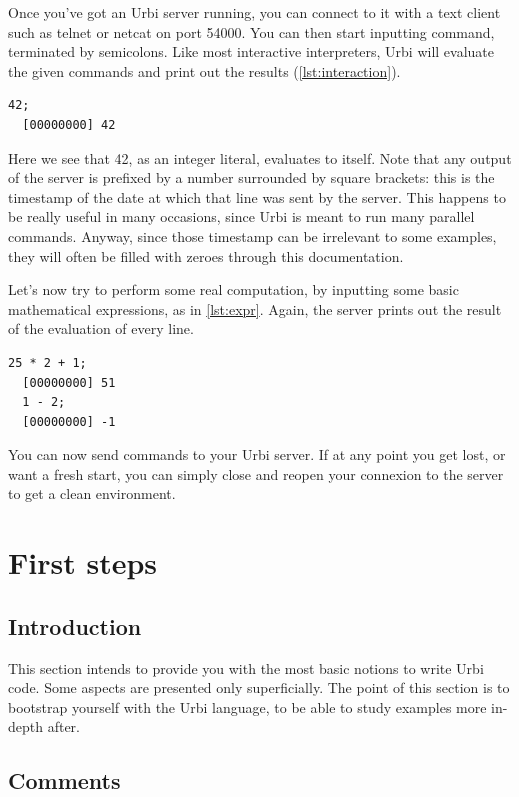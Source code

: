 \documentclass[openright,twoside,12pt]{report}
\newcommand{\urbi}{Urbi\xspace}
\newcommand{\lst}[1]{\autoref{lst:#1}}
\begin{document}
Once you've got an \urbi server running, you can connect to it with a
text client such as telnet or netcat on port 54000. You can then start
inputting command, terminated by semicolons. Like most interactive
interpreters, \urbi will evaluate the given commands and print out the
results (\lst{interaction}).

\begin{lstlisting}[caption=Evaluating literal values,label=lst:interaction]
  42;
  [00000000] 42
\end{lstlisting}

Here we see that 42, as an integer literal, evaluates to itself. Note
that any output of the server is prefixed by a number surrounded by
square brackets: this is the timestamp of the date at which that line
was sent by the server. This happens to be really useful in many
occasions, since \urbi is meant to run many parallel commands. Anyway,
since those timestamp can be irrelevant to some examples, they will
often be filled with zeroes through this documentation.

Let's now try to perform some real computation, by inputting some
basic mathematical expressions, as in \lst{expr}. Again, the server
prints out the result of the evaluation of every line.

\begin{lstlisting}[caption=Evaluating composite expressions,label=lst:expr]
  25 * 2 + 1;
  [00000000] 51
  1 - 2;
  [00000000] -1
\end{lstlisting}

You can now send commands to your \urbi server. If at any point you
get lost, or want a fresh start, you can simply close and reopen your
connexion to the server to get a clean environment.

\chapter{First steps}

\section{Introduction}

This section intends to provide you with the most basic notions to
write \urbi code. Some aspects are presented only superficially. The
point of this section is to bootstrap yourself with the \urbi
language, to be able to study examples more in-depth after.

\section{Comments}
\end{document}
